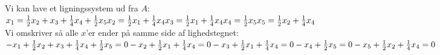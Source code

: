\documentclass[a4paper,12pt]{article}
\begin{document}
\subsection{}
Vi kan lave et ligningssystem ud fra $A$:\\

$
x_1= \frac{1}{2}x_2 + x_3 + \frac{1}{4}x_4 + \frac{1}{2}x_5\\
x_2= \frac{1}{2}x_1 + \frac{1}{4}x_4 \\
x_3= \frac{1}{2}x_1 + \frac{1}{4}x_4 \\
x_4= \frac{1}{2}x_5 \\
x_5= \frac{1}{2}x_2 + \frac{1}{4}x_4
$\\

Vi omskriver så alle $x$'er ender på samme side af lighedstegnet:\\
$
-x_1 + \frac{1}{2}x_2 + x_3 + \frac{1}{4}x_4 + \frac{1}{2}x_5 = 0 \\
-x_2 + \frac{1}{2}x_1 + \frac{1}{4}x_4 = 0 \\
-x_3 + \frac{1}{2}x_1 + \frac{1}{4}x_4 = 0 \\
-x_4 + \frac{1}{2}x_5 = 0 \\
-x_5 + \frac{1}{2}x_2 + \frac{1}{4}x_4 = 0
$\\
\end{document}
